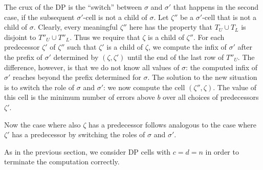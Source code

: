 The crux of the DP is the ``switch'' between $\sigma$ and $\sigma'$ that happens in the second case, if the subsequent $\sigma'$-cell is not a child of $\sigma$.
Let $\zeta''$ be a $\sigma'$-cell that is not a child of $\sigma$.
Clearly, every meaningful $\zeta''$ here has the property that  $T_U \cup T_L$ is disjoint to $T''_U \cup T''_L$.
Thus we require that $\zeta$ is a child of $\zeta''$.
For each predecessor $\zeta'$ of $\zeta''$ such that $\zeta'$ is a child of $\zeta$,
we compute the infix of $\sigma'$ after the prefix of $\sigma'$ determined by $(\zeta,\zeta')$ until the end of the last row of $T''_U$.
The difference, however, is that we do not know all values of $\sigma$: the computed infix of $\sigma'$ reaches beyond the prefix determined for $\sigma$.
The solution to the new situation is to switch the role of $\sigma$ and $\sigma'$: we now compute the cell $(\zeta'',\zeta)$.
The value of this cell is the minimum number of errors above $b$ over all choices of predecessors $\zeta'$.

Now the case where also $\zeta$ has a predecessor follows analogous to the case where $\zeta'$ has a predecessor by switching the roles of $\sigma$ and $\sigma'$.

As in the previous section, we consider DP cells with $c=d=n$ in order to terminate the computation correctly.

